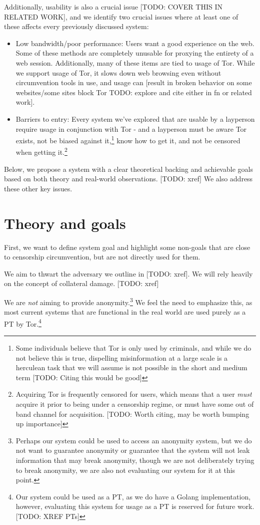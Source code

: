 \documentclass[12pt]{report}
\begin{document}
Additionally, usability is also a crucial issue [TODO: COVER THIS IN RELATED WORK], and we identify two crucial issues where at least one of these affects every previously discussed system:
\begin{itemize}
  \item Low bandwidth/poor performance: Users want a good experience on the web. Some of these methods are completely unusable for proxying the entirety of a web session. Additionally, many of these items are tied to usage of Tor. While we support usage of Tor, it slows down web browsing even without circumvention tools in use, and usage can [result in broken behavior on some websites/some sites block Tor TODO: explore and cite either in fn or related work].
  \item Barriers to entry: Every system we've explored that are usable by a layperson require usage in conjunction with Tor - and a layperson must be aware Tor exists, not be biased against it,\footnote{Some individuals believe that Tor is only used by criminals, and while we do not believe this is true, dispelling misinformation at a large scale is a herculean task that we will assume is not possible in the short and medium term [TODO: Citing this would be good]} know how to get it, and not be censored when getting it.\footnote{Acquiring Tor is frequently censored for users, which means that a user \emph{must} acquire it prior to being under a censorship regime, or must have some out of band channel for acquisition. [TODO: Worth citing, may be worth bumping up importance]}
\end{itemize}

Below, we propose a system with a clear theoretical backing and achievable goals based on both theory and real-world observations. [TODO: xref] We also address these other key issues.

\section{Theory and goals}

First, we want to define system goal and highlight some non-goals that are close to censorship circumvention, but are not directly used for them.

We aim to thwart the adversary we outline in [TODO: xref]. We will rely heavily on the concept of collateral damage. [TODO: xref]

We are \emph{not} aiming to provide anonymity.\footnote{Perhaps our system could be used to access an anonymity system, but we do not want to guarantee anonymity or guarantee that the system will not leak information that may break anonymity, though we are not deliberately trying to break anonymity, we are also not evaluating our system for it at this point.} We feel the need to emphasize this, as most current systems that are functional in the real world are used purely as a PT by Tor.\footnote{Our system could be used as a PT, as we do have a Golang implementation, however, evaluating this system for usage as a PT is reserved for future work. [TODO: XREF PTs]}
\end{document}
